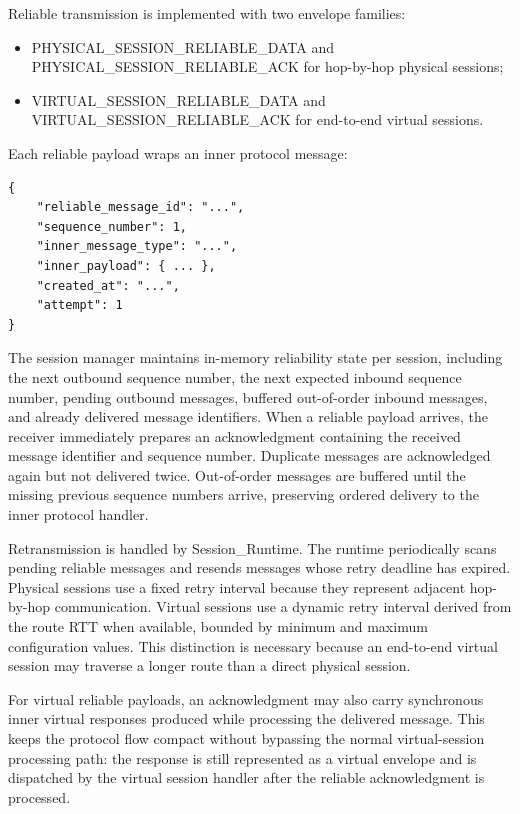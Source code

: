 \documentclass[12pt,a4paper]{article}
\newcommand{\codebreak}[1]{{\footnotesize\ttfamily #1}}
\begin{document}
Reliable transmission is implemented with two envelope families:

\begin{itemize}
    \item \codebreak{PHYSICAL\_\allowbreak{}SESSION\_\allowbreak{}RELIABLE\_\allowbreak{}DATA} and \codebreak{PHYSICAL\_\allowbreak{}SESSION\_\allowbreak{}RELIABLE\_\allowbreak{}ACK} for hop-by-hop physical sessions;
    \item \codebreak{VIRTUAL\_\allowbreak{}SESSION\_\allowbreak{}RELIABLE\_\allowbreak{}DATA} and \codebreak{VIRTUAL\_\allowbreak{}SESSION\_\allowbreak{}RELIABLE\_\allowbreak{}ACK} for end-to-end virtual sessions.
\end{itemize}

Each reliable payload wraps an inner protocol message:

\begin{verbatim}
{
    "reliable_message_id": "...",
    "sequence_number": 1,
    "inner_message_type": "...",
    "inner_payload": { ... },
    "created_at": "...",
    "attempt": 1
}
\end{verbatim}

The session manager maintains in-memory reliability state per session, including the next outbound sequence number, the next expected inbound sequence number, pending outbound messages, buffered out-of-order inbound messages, and already delivered message identifiers. When a reliable payload arrives, the receiver immediately prepares an acknowledgment containing the received message identifier and sequence number. Duplicate messages are acknowledged again but not delivered twice. Out-of-order messages are buffered until the missing previous sequence numbers arrive, preserving ordered delivery to the inner protocol handler.

Retransmission is handled by \codebreak{Session\_\allowbreak{}Runtime}. The runtime periodically scans pending reliable messages and resends messages whose retry deadline has expired. Physical sessions use a fixed retry interval because they represent adjacent hop-by-hop communication. Virtual sessions use a dynamic retry interval derived from the route RTT when available, bounded by minimum and maximum configuration values. This distinction is necessary because an end-to-end virtual session may traverse a longer route than a direct physical session.

For virtual reliable payloads, an acknowledgment may also carry synchronous inner virtual responses produced while processing the delivered message. This keeps the protocol flow compact without bypassing the normal virtual-session processing path: the response is still represented as a virtual envelope and is dispatched by the virtual session handler after the reliable acknowledgment is processed.
\end{document}
